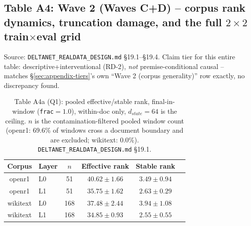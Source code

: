 \clearpage
\subsection{Table A4: Wave 2 (Waves C+D) -- corpus rank dynamics, truncation damage, and the full $2\times2$ train$\times$eval grid}
\label{tab:a4-wave2}

Source: \texttt{DELTANET\_REALDATA\_DESIGN.md} \S19.1--\S19.4. Claim tier
for this entire table: descriptive+interventional (RD-2), \emph{not}
premise-conditional causal -- matches \S\ref{sec:appendix-tiers}'s own
``Wave 2 (corpus generality)'' row exactly, no discrepancy found.

\begin{table}[htbp]
\centering
\small
\begin{tabular}{clcccc}
\toprule
Corpus & Layer & $n$ & Effective rank & Stable rank \\
\midrule
openr1 & L0 & 51 & $40.62 \pm 1.66$ & $3.49 \pm 0.94$ \\
openr1 & L1 & 51 & $35.75 \pm 1.62$ & $2.63 \pm 0.29$ \\
wikitext & L0 & 168 & $37.48 \pm 2.44$ & $3.94 \pm 1.08$ \\
wikitext & L1 & 168 & $34.85 \pm 0.93$ & $2.55 \pm 0.55$ \\
\bottomrule
\end{tabular}
\caption{Table A4a (Q1): pooled effective/stable rank, final-in-window
(\texttt{frac}$=1.0$), within-doc only, $d_{state}{=}64$ is the ceiling.
$n$ is the contamination-filtered pooled window count (openr1: 69.6\% of
windows cross a document boundary and are excluded; wikitext: 0.0\%).
\texttt{DELTANET\_REALDATA\_DESIGN.md} \S19.1.}
\end{table}

